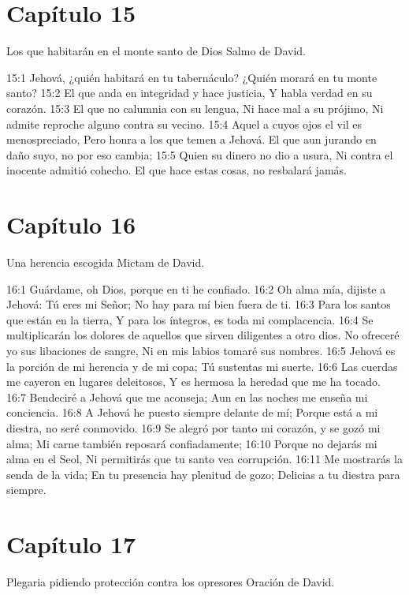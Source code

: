 \section*{Capítulo 15}
Los que habitarán en el monte santo de Dios 
Salmo de David. 

15:1 Jehová, ¿quién habitará en tu tabernáculo? 
¿Quién morará en tu monte santo? 
15:2 El que anda en integridad y hace justicia, 
Y habla verdad en su corazón. 
15:3 El que no calumnia con su lengua, 
Ni hace mal a su prójimo, 
Ni admite reproche alguno contra su vecino. 
15:4 Aquel a cuyos ojos el vil es menospreciado, 
Pero honra a los que temen a Jehová. 
El que aun jurando en daño suyo, no por eso cambia; 
15:5 Quien su dinero no dio a usura, 
Ni contra el inocente admitió cohecho. 
El que hace estas cosas, no resbalará jamás. 
\section*{Capítulo 16}
Una herencia escogida 
Mictam de David. 

16:1 Guárdame, oh Dios, porque en ti he confiado. 
16:2 Oh alma mía, dijiste a Jehová: 
Tú eres mi Señor; 
No hay para mí bien fuera de ti. 
16:3 Para los santos que están en la tierra, 
Y para los íntegros, es toda mi complacencia. 
16:4 Se multiplicarán los dolores de aquellos que sirven diligentes a otro dios. 
No ofreceré yo sus libaciones de sangre, 
Ni en mis labios tomaré sus nombres. 
16:5 Jehová es la porción de mi herencia y de mi copa; 
Tú sustentas mi suerte. 
16:6 Las cuerdas me cayeron en lugares deleitosos, 
Y es hermosa la heredad que me ha tocado. 
16:7 Bendeciré a Jehová que me aconseja; 
Aun en las noches me enseña mi conciencia. 
16:8 A Jehová he puesto siempre delante de mí; 
Porque está a mi diestra, no seré conmovido. 
16:9 Se alegró por tanto mi corazón, y se gozó mi alma; 
Mi carne también reposará confiadamente; 
16:10 Porque no dejarás mi alma en el Seol, 
Ni permitirás que tu santo vea corrupción. 
16:11 Me mostrarás la senda de la vida; 
En tu presencia hay plenitud de gozo; 
Delicias a tu diestra para siempre. 
\section*{Capítulo 17}
Plegaria pidiendo protección contra los opresores 
Oración de David. 

